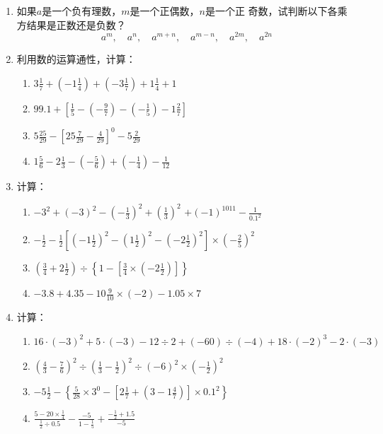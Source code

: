 \begin{enumerate}
\item 如果$a$是一个负有理数，$m$是一个正偶数，$n$是一个正
奇数，试判断以下各乘方结果是正数还是负数？
\[a^m,\quad a^n,\quad a^{m+n},\quad a^{m-n},\quad a^{2m},\quad a^{2n} \]

\item 利用数的运算通性，计算：
\begin{enumerate}
\item  $3 \frac{1}{7}+\left(-1 \frac{1}{4}\right)+\left(-3 \frac{1}{7}\right)+1 \frac{1}{4}+1$
\item  $99.1+\left[\frac{1}{5}-\left(-\frac{9}{7}\right)-\left(-\frac{1}{5}\right)-1 \frac{2}{7}\right]$
\item  $5 \frac{25}{29}-\left[25 \frac{7}{29}-\frac{4}{29}\right]^{0}-5 \frac{2}{29}$
\item  $1 \frac{5}{6}-2 \frac{1}{3}-\left(-\frac{5}{6}\right)+\left(-\frac{1}{4}\right)-\frac{1}{12}$ 
\end{enumerate}

\item  计算：
\begin{enumerate}
\item $-3^{2}+(-3)^{2}-\left(-\frac{1}{3}\right)^{2}+\left(\frac{1}{3}\right)^{2}$
$+(-1)^{1011}-\frac{1}{0.1^{2}}$
\item $-\frac{1}{2}-\frac{1}{2}\left[\left(-1 \frac{1}{2}\right)^{2}-\left(1 \frac{1}{2}\right)^{2}-\left(-2 \frac{1}{2}\right)^{2}\right] \times\left(-\frac{2}{5}\right)^{2}$
\item $\left(\frac{3}{4}+2 \frac{1}{2}\right) \div\left\{1-\left[\frac{3}{4} \times\left(-2 \frac{1}{2}\right)\right]\right\}$
\item $-3.8+4.35-10 \frac{9}{10} \times(-2)-1.05 \times 7$
\end{enumerate}


\item 计算：
\begin{enumerate}
    \item $16 \cdot(-3)^{2}+5 \cdot(-3)-12 \div 2+(-60) \div(-4)+18 \cdot(-2)^{3}-2 \cdot(-3)$
    \item $\left(\frac{4}{3}-\frac{7}{6}\right)^{2} \div\left(\frac{1}{3}-\frac{1}{2}\right)^{2} \div(-6)^{2} \times\left(-\frac{1}{2}\right)^{2}$
    \item $-5 \frac{1}{2}-\left\{\frac{5}{28} \times 3^{0}-\left[2 \frac{1}{7}+\left(3-1 \frac{4}{7}\right)\right] \times 0.1^{2}\right\}$
    \item $\frac{5-20 \times \frac{1}{4}}{\frac{1}{2}\div 0.5}-\frac{-5}{1-\frac{1}{5}}+\frac{-\frac{1}{2}+1.5}{-5}$
\end{enumerate}


\end{enumerate}

